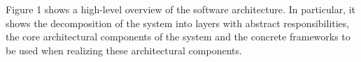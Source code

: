 Figure 1 shows a high-level overview of the software architecture. In particular, it shows the decomposition of the system into layers with abstract responsibilities, the core architectural components of the system and the concrete frameworks to be used when realizing these architectural components.